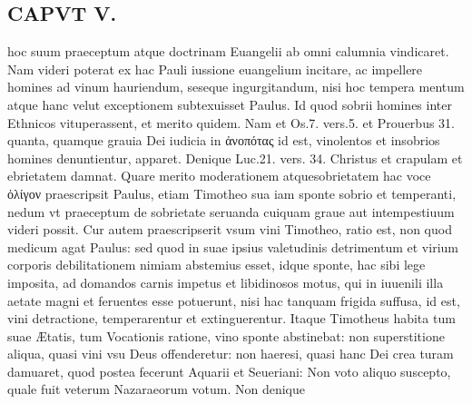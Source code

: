 \documentclass{article}
\begin{document}
\begin{pages}
\section*{CAPVT V. }
\marginpar{[ p.369 ]}\pstart hoc suum praeceptum atque doctrinam Euangelii ab omni calumnia vindicaret. Nam videri poterat ex hac Pauli iussione euangelium incitare, ac impellere homines ad vinum hauriendum, seseque ingurgitandum, nisi hoc tempera mentum atque hanc velut exceptionem subtexuisset Paulus. Id quod sobrii homines inter Ethnicos vituperassent, et merito quidem. Nam et Os.7. vers.5. et Prouerbus 31. quanta, quamque grauia Dei iudicia in ἀνοπότας id est, vinolentos et insobrios homines denuntientur, apparet. Denique Luc.21. vers. 34. Christus et crapulam et ebrietatem damnat. Quare merito moderationem atquesobrietatem hac voce ὀλίγον praescripsit Paulus, etiam Timotheo sua iam sponte sobrio et temperanti, nedum vt praeceptum de sobrietate seruanda cuiquam graue aut intempestiuum videri possit. Cur autem praescripserit vsum vini Timotheo, ratio est, non quod medicum agat Paulus: sed quod in suae ipsius valetudinis detrimentum et virium corporis debilitationem nimiam abstemius esset, idque sponte, hac sibi lege imposita, ad domandos carnis impetus et libidinosos motus, qui in iuuenili illa aetate magni et feruentes esse potuerunt, nisi hac tanquam frigida suffusa, id est, vini detractione, temperarentur et extinguerentur. Itaque Timotheus habita tum suae Ætatis, tum Vocationis ratione, vino sponte abstinebat: non superstitione aliqua, quasi vini vsu Deus offenderetur: non haeresi, quasi hanc Dei crea turam damuaret, quod postea fecerunt Aquarii et Seueriani: Non voto aliquo suscepto, quale fuit veterum Nazaraeorum votum. Non denique  \pend

\end{pages}
\end{document}
